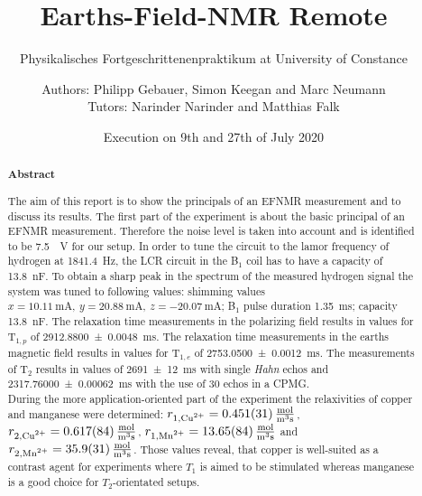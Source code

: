 \title{Earths-Field-NMR Remote}
\subtitle{Physikalisches Fortgeschrittenenpraktikum at University of Constance}
\author{Authors: Philipp Gebauer, Simon Keegan and Marc Neumann \\ \large{Tutors: Narinder Narinder and Matthias Falk}}
\date{Execution on 9th and 27th of July 2020}
\maketitle
\begin{abstract}
    \begin{center}
        \Large{\textsf{\textbf{Abstract}}}
    \end{center}
    \vspace{0.75 cm}
    \begin{singlespace}
    \noindent The aim of this report is to show the principals of an EFNMR measurement and to discuss its results.\newline
    The first part of the experiment is about the basic principal of an EFNMR measurement.
    Therefore the noise level is taken into account and is identified to be \SI{7.5}{\mu \volt} for our setup.
    In order to tune the circuit to the lamor frequency of hydrogen at \SI{1841.4}{\hertz}, the LCR circuit in the B$_1$ coil has to have a capacity of \SI{13.8}{\nano \farad}.
    To obtain a sharp peak in the spectrum of the measured hydrogen signal the system was tuned to following values: shimming values $x = \SI{10.11}{\milli \ampere}, \ y = \SI{20.88}{\milli \ampere}, \ z = \SI{-20.07}{\milli \ampere}$; B$_1$ pulse duration \SI{1.35}{\milli \second}; capacity \SI{13.8}{\nano \farad}.
    The relaxation time measurements in the polarizing field results in values for T$_{1,p}$ of \SI{2912.8800 \pm 0.0048}{\milli \second}.
    The relaxation time measurements in the earths magnetic field results in values for T$_{1,e}$ of \SI{2753.0500 \pm 0.0012}{\milli \second}.
    The measurements of T$_2$ results in values of \SI{2691 \pm 12}{\milli \second} with single \textit{Hahn} echos and \SI{2317.76000 \pm 0.00062}{\milli \second} with the use of 30 echos in a CPMG.\\
    During the more application-oriented part of the experiment the relaxivities of copper and manganese were determined: $r_{1,\text{\ce{Cu^2+}}} = \SI{0.451 \pm 0.031}{\frac{\mol}{\metre \cubed \second}}$, $r_{2,\text{\ce{Cu^2+}}} = \SI{0.617 \pm 0.084}{\frac{\mol}{\metre \cubed \second}}$, $r_{1,\text{\ce{Mn^2+}}} = \SI{13.65 \pm 0.84}{\frac{\mol}{\metre \cubed \second}}$ and $r_{2,\text{\ce{Mn^2+}}} = \SI{35.9 \pm 3.1}{\frac{\mol}{\metre \cubed \second}}$. Those values reveal, that copper is well-suited as a contrast agent for experiments where $T_1$ is aimed to be stimulated whereas manganese is a good choice for $T_2$-orientated setups.

\end{singlespace}
\end{abstract}
